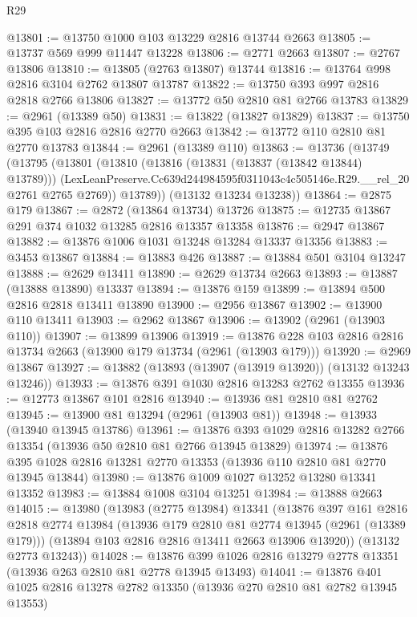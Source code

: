 \begin{lexlean}{R29}
\begin{coremodule}
@13801 := @13750 @1000 @103 @13229 @2816 @13744 @2663
@13805 := @13737 @569 @999 @11447 @13228
@13806 := @2771 @2663
@13807 := @2767 @13806
@13810 := @13805 (@2763 @13807) @13744
@13816 := @13764 @998 @2816 @3104 @2762 @13807 @13787
@13822 := @13750 @393 @997 @2816 @2818 @2766 @13806
@13827 := @13772 @50 @2810 @81 @2766 @13783
@13829 := @2961 (@13389 @50)
@13831 := @13822 (@13827 @13829)
@13837 := @13750 @395 @103 @2816 @2816 @2770 @2663
@13842 := @13772 @110 @2810 @81 @2770 @13783
@13844 := @2961 (@13389 @110)
@13863 := @13736
    (@13749
      (@13795
        (@13801
          (@13810
            (@13816 (@13831 (@13837 (@13842 @13844) @13789)))
            (LexLeanPreserve.Cc639d244984595f0311043c4c505146e.R29.__rel_20 @2761 @2765 @2769))
          @13789))
      (@13132 @13234 @13238))
@13864 := @2875 @179
@13867 := @2872 (@13864 @13734) @13726
@13875 := @12735 @13867 @291 @374 @1032 @13285 @2816 @13357 @13358
@13876 := @2947 @13867
@13882 := @13876 @1006 @1031 @13248 @13284 @13337 @13356
@13883 := @3453 @13867
@13884 := @13883 @426
@13887 := @13884 @501 @3104 @13247
@13888 := @2629 @13411
@13890 := @2629 @13734 @2663
@13893 := @13887 (@13888 @13890) @13337
@13894 := @13876 @159
@13899 := @13894 @500 @2816 @2818 @13411 @13890
@13900 := @2956 @13867
@13902 := @13900 @110 @13411
@13903 := @2962 @13867
@13906 := @13902 (@2961 (@13903 @110))
@13907 := @13899 @13906
@13919 := @13876 @228 @103 @2816 @2816 @13734 @2663 (@13900 @179 @13734 (@2961 (@13903 @179)))
@13920 := @2969 @13867
@13927 := @13882 (@13893 (@13907 (@13919 @13920)) (@13132 @13243 @13246))
@13933 := @13876 @391 @1030 @2816 @13283 @2762 @13355
@13936 := @12773 @13867 @101 @2816
@13940 := @13936 @81 @2810 @81 @2762
@13945 := @13900 @81 @13294 (@2961 (@13903 @81))
@13948 := @13933 (@13940 @13945 @13786)
@13961 := @13876 @393 @1029 @2816 @13282 @2766 @13354 (@13936 @50 @2810 @81 @2766 @13945 @13829)
@13974 := @13876 @395 @1028 @2816 @13281 @2770 @13353 (@13936 @110 @2810 @81 @2770 @13945 @13844)
@13980 := @13876 @1009 @1027 @13252 @13280 @13341 @13352
@13983 := @13884 @1008 @3104 @13251
@13984 := @13888 @2663
@14015 := @13980
    (@13983
      (@2775 @13984)
      @13341
      (@13876
        @397
        @161
        @2816
        @2818
        @2774
        @13984
        (@13936 @179 @2810 @81 @2774 @13945 (@2961 (@13389 @179)))
        (@13894 @103 @2816 @2816 @13411 @2663 @13906 @13920))
      (@13132 @2773 @13243))
@14028 := @13876 @399 @1026 @2816 @13279 @2778 @13351 (@13936 @263 @2810 @81 @2778 @13945 @13493)
@14041 := @13876 @401 @1025 @2816 @13278 @2782 @13350 (@13936 @270 @2810 @81 @2782 @13945 @13553)

\end{coremodule}
\end{lexlean}
